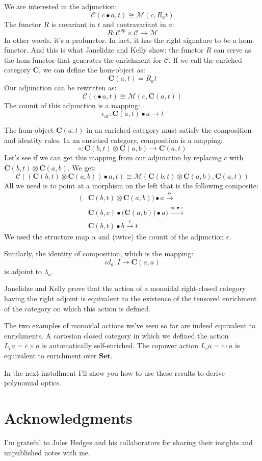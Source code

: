 \documentclass[11pt]{amsart}
\begin{document}
We are interested in the adjunction:
\[ \mathcal{C}( c \bullet a, t) \cong \mathcal{M}(c, R_a t) \]
The functor $R$ is covariant in $t$ and contravariant in $a$:
\[ R \colon \mathcal{C}^{op} \times \mathcal{C} \to \mathcal{M} \]
In other words, it's a profunctor. In fact, it has the right signature to be a hom-functor. And this is what Janelidze and Kelly show: the functor $R$ can serve as the hom-functor that generates the enrichment for $\mathcal{C}$. If we call the enriched category $\mathbf{C}$, we can define the hom-object as:
\[\mathbf{C}(a, t) = R_a t \]
Our adjunction can be rewritten as:
\[ \mathcal{C}( c \bullet a, t) \cong \mathcal{M}(c, \mathbf{C}(a, t)) \]
The counit of this adjunction is a mapping:
\[ \epsilon_{a t} \colon \mathbf{C}(a, t)  \bullet a \to t \]

The hom-object $\mathbf{C}(a, t)$ in an enriched category must satisfy the composition and identity rules. In an enriched category, composition is a mapping:
\[ \circ \colon \mathbf{C}(b, t) \otimes \mathbf{C}(a, b) \to \mathbf{C}(a, t) \]
Let's see if we can get this mapping from our adjunction by replacing $c$ with $\mathbf{C}(b, t) \otimes \mathbf{C}(a, b)$. We get:
\[ \mathcal{C}( (\mathbf{C}(b, t) \otimes \mathbf{C}(a, b)) \bullet a, t) \cong \mathcal{M}(\mathbf{C}(b, t) \otimes \mathbf{C}(a, b), \mathbf{C}(a, t)) \]
All we need is to point at a morphism on the left that is the following composite:
\begin{align*}
\big( & \mathbf{C}(b, t) \otimes \mathbf{C}(a, b)\big) \bullet a  \xrightarrow{\alpha}
\\ &\mathbf{C}(b, c) \bullet \big(\mathbf{C}(a, b)) \bullet a\big)   \xrightarrow{id \; \bullet \; \epsilon}
\\ &\mathbf{C}(b, t) \bullet b  \xrightarrow{\epsilon} t
\end{align*}
We used the structure map $\alpha$ and (twice) the counit of the adjunction $\epsilon$.

Similarly, the identity of composition, which is the mapping:
\[ id_a \colon I \to \mathbf{C}(a, a) \]
is adjoint to $\lambda_a$.

Janelidze and Kelly prove that the action of a monoidal right-closed category having the right adjoint is equivalent to the existence of the tensored enrichment of the category on which this action is defined.

The two examples of monoidal actions we've seen so far are indeed equivalent to enrichments. A cartesian closed category in which we defined the action $L_c a = c \times a$ is automatically self-enriched. The copower action $L_c a = c \cdot a$ is equivalent to enrichment over $\mathbf{Set}$.

In the next installment I'll show you how to use these results to derive polynomial optics.

\section{Acknowledgments}
I'm grateful to Jules Hedges and his collaborators for sharing their insights and unpublished notes with me.
\end{document}

